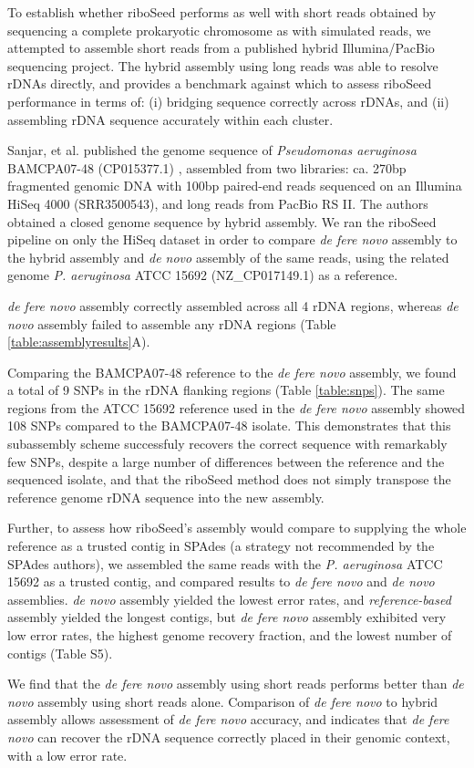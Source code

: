 To establish whether riboSeed performs as well with short reads obtained by sequencing a complete prokaryotic chromosome as with simulated reads, we attempted to assemble short reads from a published hybrid Illumina/PacBio sequencing project. The hybrid assembly using long reads was able to resolve rDNAs directly, and provides a benchmark against which to assess riboSeed performance in terms of: (i) bridging sequence correctly across rDNAs, and (ii) assembling rDNA sequence accurately within each cluster.


Sanjar, et al. published the genome sequence of \textit{Pseudomonas aeruginosa} BAMCPA07-48 (CP015377.1) \cite{Sanjar2016}, assembled from two libraries: ca. 270bp fragmented genomic DNA with 100bp paired-end reads sequenced on an Illumina HiSeq 4000 (SRR3500543), and long reads from PacBio RS II. The authors obtained a closed genome sequence by hybrid assembly. We ran the riboSeed pipeline on only the HiSeq dataset in order to compare \textit{de fere novo} assembly to the hybrid assembly and \textit{de novo} assembly of the same reads, using the related genome \textit{P. aeruginosa} ATCC 15692 (NZ\_CP017149.1) as a reference.

\textit{de fere novo} assembly correctly assembled across all 4 rDNA regions, whereas \textit{de novo} assembly failed to assemble any rDNA regions (Table \ref{table:assemblyresults}A).

Comparing the BAMCPA07-48 reference to the \textit{de fere novo} assembly, we found a total of 9 SNPs in the rDNA flanking regions (Table \ref{table:snps}). The same regions from the ATCC 15692 reference used in the \textit{de fere novo} assembly showed 108 SNPs compared to the BAMCPA07-48 isolate.  This demonstrates that this subassembly scheme successfuly recovers the correct sequence with remarkably few SNPs, despite a large number of differences between the reference and the sequenced isolate, and that the riboSeed method does not simply transpose the reference genome rDNA sequence into the new assembly.

Further, to assess how riboSeed's assembly would compare to supplying the whole reference as a trusted contig in SPAdes (a strategy not recommended by the SPAdes authors), we assembled the same reads with the \textit{P. aeruginosa} ATCC 15692 as a trusted contig, and compared results to \textit{de fere novo} and \textit{de novo} assemblies. \textit{de novo} assembly yielded the lowest error rates, and \textit{reference-based}  assembly yielded the longest contigs, but \textit{de fere novo} assembly exhibited very low error rates, the highest genome recovery fraction, and the lowest number of contigs (Table S5).


We find that the \textit{de fere novo} assembly using short reads performs better than \textit{de novo} assembly using short reads alone. Comparison of \textit{de fere novo} to hybrid assembly allows assessment of \textit{de fere novo} accuracy, and indicates that \textit{de fere novo} can recover the rDNA sequence correctly placed in their genomic context, with a low error rate.

